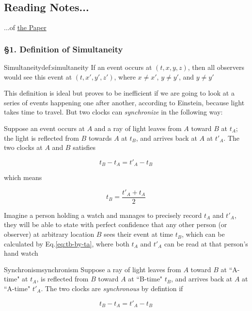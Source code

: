 \subsection{Reading Notes...}

...of \hyperlink{sr-original-paper}{the Paper}

\subsubsection{\hfil \S1. Definition of Simultaneity \hfil}

\begin{Definition}{Simultaneity}{def:simultaneity}
    If an event occurs at $(t, x, y, z)$, then all observers would see this event at $(t, x', y', z')$, where
    $x \ne x'$, $y \ne y'$, and $y \ne y'$
\end{Definition}

This definition is ideal but proves to be inefficient if we are going to look at a series of events happening one after
another, according to Einstein, because light takes time to travel. But two clocks can \textit{synchronize} in the
following way:

Suppose an event occurs at $A$ and a ray of light leaves from $A$ toward $B$ at $t_A$; the light is reflected from $B$
towards $A$ at $t_B$, and arrives back at $A$ at $t'_A$. The two clocks at $A$ and $B$ satisfies

\[
    t_B - t_A = t'_A - t_B
\]

which means

\begin{equation}\label{eq:tb-by-ta}
    t_B = \frac{t'_A + t_A}{2}
\end{equation}

Imagine a person holding a watch and manages to precisely record $t_A$ and $t'_A$, they will be able to state with
perfect confidence that any other person (or observer) at arbitrary location $B$ sees their event at time $t_B$, which
can be calculated by Eq.\ref{eq:tb-by-ta}, where both $t_A$ and $t'_A$ can be read at that person's hand watch

\begin{Definition}{Synchronism}{synchronism}
    Suppose a ray of light leaves from $A$ toward $B$ at ``A-time" at $t_A$, is reflected from $B$ toward $A$ at
    ``B-time" $t_B$, and arrives back at $A$ at ``A-time" $t'_A$. The two clocks are \textit{synchronous} by defintion
    if

    \begin{equation}
        t_B - t_A = t'_A - t_B
    \end{equation}
\end{Definition}

